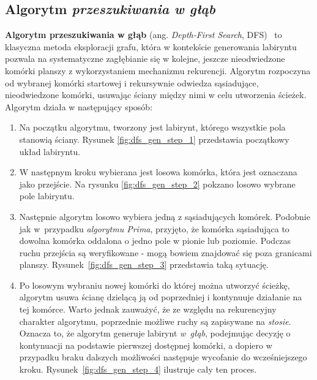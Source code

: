 \subsection{Algorytm \textit{przeszukiwania w głąb}}

\textbf{Algorytm przeszukiwania w głąb} (ang. \textit{Depth-First Search}, DFS)~\cite{cormen2009} to klasyczna metoda eksploracji grafu, która w kontekście generowania labiryntu pozwala na systematyczne zagłębianie się w kolejne, jeszcze nieodwiedzone komórki planszy z wykorzystaniem mechanizmu rekurencji. Algorytm rozpoczyna od wybranej komórki startowej i rekursywnie odwiedza sąsiadujące, nieodwiedzone komórki, usuwając ściany między nimi w celu utworzenia ścieżek. Algorytm działa w następujący sposób:

\begin{enumerate}
    \item Na początku algorytmu, tworzony jest labirynt, którego wszystkie pola stanowią ściany. Rysunek \ref{fig:dfs_gen_step_1} przedstawia początkowy układ labiryntu.
    
    

    \item W następnym kroku wybierana jest losowa komórka, która jest oznaczana jako przejście. Na rysunku \ref{fig:dfs_gen_step_2} pokzano losowo wybrane pole labiryntu.

    

    \item Następnie algorytm losowo wybiera jedną z sąsiadujących komórek. Podobnie jak w~przypadku \textit{algorytmu Prima}, przyjęto, że komórka sąsiadująca to dowolna komórka oddalona o jedno pole w pionie lub poziomie. Podczas ruchu przejścia są weryfikowane - mogą bowiem znajdować się poza granicami planszy. Rysunek~\ref{fig:dfs_gen_step_3} przedstawia taką sytuację.
    
    

    \item Po losowym wybraniu nowej komórki do której można utworzyć ścieżkę, algorytm usuwa ścianę dzielącą ją od poprzedniej i kontynuuje działanie na tej komórce. Warto jednak zauważyć, że ze względu na rekurencyjny charakter algorytmu, poprzednie możliwe ruchy są zapisywane na \textit{stosie}. Oznacza to, że algorytm generuje labirynt \textit{w~głąb}, podejmując decyzję o kontynuacji na podstawie pierwszej dostępnej komórki, a dopiero w przypadku braku dalszych możliwości następuje wycofanie do wcześniejszego kroku. Rysunek~\ref{fig:dfs_gen_step_4} ilustruje cały ten proces.


\end{enumerate}
